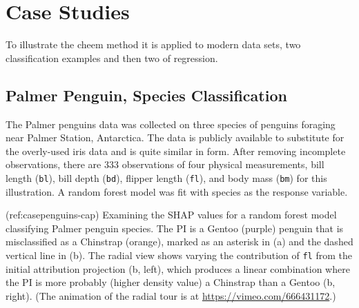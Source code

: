 \documentclass[
]{jss}
\begin{document}
\hypertarget{sec:casestudies}{%
\section{Case Studies}\label{sec:casestudies}}

To illustrate the cheem method it is applied to modern data sets, two
classification examples and then two of regression.

\hypertarget{palmer-penguin-species-classification}{%
\subsection{Palmer Penguin, Species
Classification}\label{palmer-penguin-species-classification}}

The Palmer penguins data
\citep{gorman_ecological_2014, horst_palmerpenguins_2020} was collected
on three species of penguins foraging near Palmer Station, Antarctica.
The data is publicly available to substitute for the overly-used iris
data and is quite similar in form. After removing incomplete
observations, there are 333 observations of four physical measurements,
bill length (\texttt{bl}), bill depth (\texttt{bd}), flipper length
(\texttt{fl}), and body mass (\texttt{bm}) for this illustration. A
random forest model was fit with species as the response variable.

(ref:casepenguins-cap) Examining the SHAP values for a random forest
model classifying Palmer penguin species. The PI is a Gentoo (purple)
penguin that is misclassified as a Chinstrap (orange), marked as an
asterisk in (a) and the dashed vertical line in (b). The radial view
shows varying the contribution of \texttt{fl} from the initial
attribution projection (b, left), which produces a linear combination
where the PI is more probably (higher density value) a Chinstrap than a
Gentoo (b, right). (The animation of the radial tour is at
\url{https://vimeo.com/666431172}.)
\end{document}

